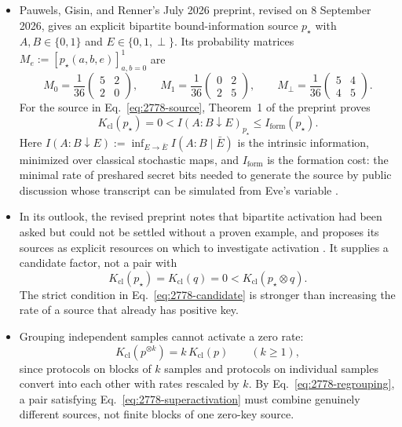 \begin{itemize}
  \item Pauwels, Gisin, and Renner's July 2026 preprint, revised on 8 September
  2026, gives an explicit bipartite bound-information source $p_\star$ with
  $A,B\in\{0,1\}$ and $E\in\{0,1,\perp\}$.  Its probability matrices
  $M_e:=[p_\star(a,b,e)]_{a,b=0}^{1}$ are
  \begin{equation}
    M_0=\frac1{36}\begin{pmatrix}5&2\\2&0\end{pmatrix},\qquad
    M_1=\frac1{36}\begin{pmatrix}0&2\\2&5\end{pmatrix},\qquad
    M_\perp=\frac1{36}\begin{pmatrix}5&4\\4&5\end{pmatrix}.
    \label{eq:2778-source}
  \end{equation}
  For the source in Eq.~\eqref{eq:2778-source}, Theorem~1 of the preprint
  proves
  \begin{equation}
    K_{\mathrm{cl}}(p_\star)=0
    <I(A:B\downarrow E)_{p_\star}
    \leq I_{\mathrm{form}}(p_\star).
    \label{eq:2778-bound-information}
  \end{equation}
  Here $I(A:B\downarrow E):=\inf_{E\to\bar E}I(A:B\mid\bar E)$ is the intrinsic
  information, minimized over classical stochastic maps, and
  $I_{\mathrm{form}}$ is the formation cost: the minimal rate of preshared
  secret bits needed to generate the source by public discussion whose
  transcript can be simulated from Eve's variable
  .

  \item In its outlook, the revised preprint notes that bipartite activation had
  been asked but could not be settled without a proven example, and proposes
  its sources as explicit resources on which to investigate activation
  .  It supplies a candidate factor, not a
  pair with
  \begin{equation}
    K_{\mathrm{cl}}(p_\star)=K_{\mathrm{cl}}(q)=0<K_{\mathrm{cl}}(p_\star\otimes q).
    \label{eq:2778-candidate}
  \end{equation}
  The strict condition in Eq.~\eqref{eq:2778-candidate} is stronger than
  increasing the rate of a source that already has positive key.

  \item Grouping independent samples cannot activate a zero rate:
  \begin{equation}
    K_{\mathrm{cl}}(p^{\otimes k})=k\,K_{\mathrm{cl}}(p)
    \qquad(k\geq1),
    \label{eq:2778-regrouping}
  \end{equation}
  since protocols on blocks of $k$ samples and protocols on individual
  samples convert into each other with rates rescaled by $k$.  By
  Eq.~\eqref{eq:2778-regrouping}, a pair satisfying
  Eq.~\eqref{eq:2778-superactivation} must combine genuinely different
  sources, not finite blocks of one zero-key source.
\end{itemize}

